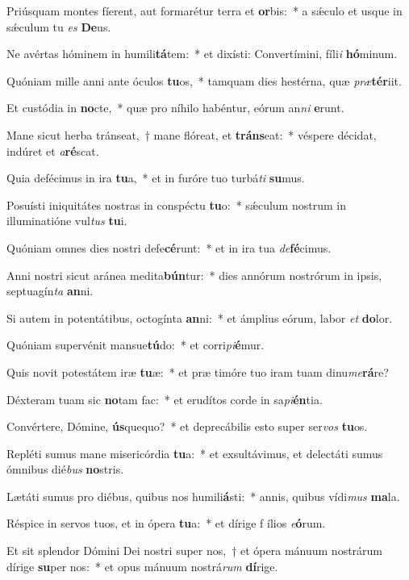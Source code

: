 \item Priúsquam montes fíerent, aut formarétur terra et \textbf{or}bis:~* a sǽculo et usque in sǽculum tu \textit{es} \textbf{De}us.
\item Ne avértas hóminem in humili\textbf{tá}tem:~* et dixísti: Convertímini, fíli\hspace*{0.01em}\textit{i} \textbf{hó}minum.
\item Quóniam mille anni ante óculos \textbf{tu}os,~* tamquam dies hestérna, quæ \textit{præ}\textbf{tér}iit.
\item Et custódia in \textbf{no}cte,~* quæ pro níhilo habéntur, eórum an\textit{ni} \textbf{e}runt.
\item Mane sicut herba tránseat,~† mane flóreat, et \textbf{tráns}eat:~* véspere décidat, indúret et \textit{a}\textbf{ré}scat.
\item Quia defécimus in ira \textbf{tu}a,~* et in furóre tuo turbá\tinyhspace\textit{ti} \textbf{su}mus.
\item Posuísti iniquitátes nostras in conspéctu \textbf{tu}o:~* sǽculum nostrum in illuminatióne vul\tinyhspace\textit{tus} \textbf{tu}i.
\item Quóniam omnes dies nostri defe\textbf{cé}runt:~* et in ira tua \textit{de}\textbf{fé}cimus.
\item Anni nostri sicut aránea medita\textbf{bún}tur:~* dies annórum nostrórum in ipsis, septuagín\tinyhspace\textit{ta} \textbf{an}ni.
\item Si autem in potentátibus, octogínta \textbf{an}ni:~* et ámplius eórum, labor \textit{et} \textbf{do}lor.
\item Quóniam supervénit mansue\textbf{tú}do:~* et corri\textit{pi}\hspace*{-0.01em}\textbf{é}mur.
\item Quis novit potestátem iræ \textbf{tu}æ:~* et præ timóre tuo iram tuam dinu\textit{me}\textbf{rá}re?
\item Déxteram tuam sic \textbf{no}tam fac:~* et erudítos corde in sa\textit{pi}\textbf{én}tia.
\item Convértere, Dómine, \textbf{ús}quequo?~* et deprecábilis esto super ser\textit{vos} \textbf{tu}os.
\item Repléti sumus mane misericórdia \textbf{tu}a:~* et exsultávimus, et delectáti sumus ómnibus dié\textit{bus} \textbf{no}stris.
\item Lætáti sumus pro diébus, quibus nos humili\textbf{á}\hspace*{0.03 em}sti:~* annis, quibus vídi\textit{mus} \textbf{ma}la.
\item Réspice in servos tuos, et in ópera \textbf{tu}a:~* et dírige f\hspace*{-0.01em} ílios \textit{e}\textbf{ó}rum.
\item Et sit splendor Dómini Dei nostri super nos,~† et ópera mánuum nostrárum dírige \textbf{su}per nos:~* et opus mánuum nostrá\tinyhspace\textit{rum} \textbf{dí}rige.
